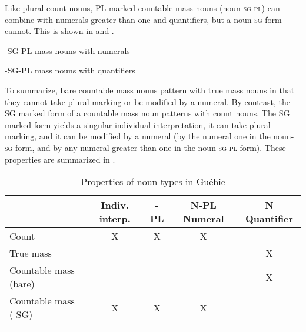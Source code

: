 \documentclass[output=paper,colorlinks,citecolor=brown]{langscibook}
\begin{document}
Like plural count nouns, PL-marked countable mass nouns (noun-\textsc{sg-pl}) can combine with numerals greater than one and quantifiers, but a noun-\textsc{sg} form cannot. This is shown in  and .

\ea%
    \label{ex:sande:11}
    -\textsc{SG-PL} mass nouns with numerals
    \z
\z

\ea%
    \label{ex:sande:12}
    -\textsc{SG-PL} mass nouns with quantifiers
    \z
\z

To summarize, bare countable mass nouns pattern with true mass nouns in that they cannot take plural marking or be modified by a numeral. By contrast, the SG marked form of a countable mass noun patterns with count nouns. The SG marked form yields a singular individual interpretation, it can take plural marking, and it can be modified by a numeral (by the numeral one in the noun-\textsc{sg} form, and by any numeral greater than one in the noun\textsc{-sg-pl} form). These properties are summarized in .

\begin{table}
	\begin{tabularx}{\textwidth}{lcccc}
	\lsptoprule
    	& Indiv. interp. & -PL & N-PL Numeral & N Quantifier \\
    	\midrule
    	Count & X & X & X & \\
    	True mass & & & & X\\
    	Countable mass (bare) & & & & X\\
    	Countable mass (-SG) & X & X & X & \\
    \lspbottomrule
	\end{tabularx}
    \caption{Properties of noun types in Guébie}
    \label{tab:sande:5}
\end{table}
\end{document}
